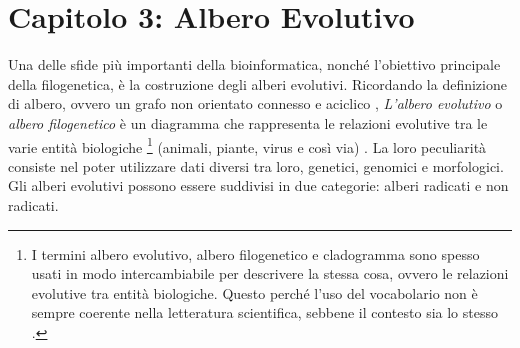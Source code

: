 \chapter{Capitolo 3: Albero Evolutivo}
Una delle sfide più importanti della bioinformatica, nonché l'obiettivo principale della filogenetica, è la costruzione degli alberi evolutivi.
\newline
Ricordando la definizione di albero, ovvero un grafo non orientato connesso e aciclico \cite{algoritmiEStruttureDati2}, \textit{L'albero evolutivo} o \textit{albero filogenetico} è un diagramma che rappresenta le relazioni evolutive tra le varie entità biologiche \footnote{I termini albero evolutivo, albero filogenetico e cladogramma sono spesso usati in modo intercambiabile per descrivere la stessa cosa, ovvero le relazioni evolutive tra entità biologiche. Questo perché l'uso del vocabolario non è sempre coerente nella letteratura scientifica, sebbene il contesto sia lo stesso \cite{bioinformaticsforbeginner}.} (animali, piante, virus e così via) \cite{buildingaphylogenictree}. La loro peculiarità consiste nel poter utilizzare dati diversi tra loro,  genetici, genomici e morfologici.
\newline
Gli alberi evolutivi possono essere suddivisi in due categorie: alberi radicati e non radicati.

